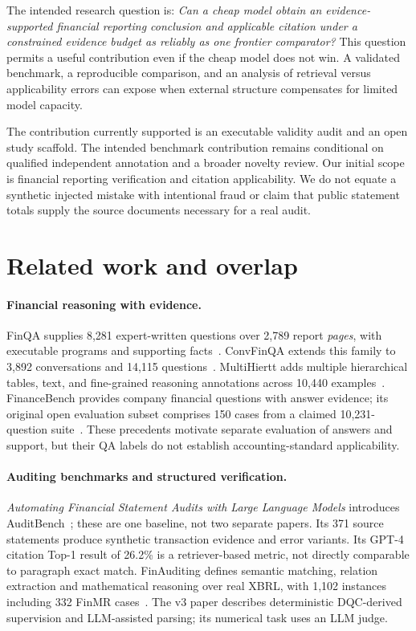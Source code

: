 \documentclass[11pt]{article}
\begin{document}
The intended research question is: \emph{Can a cheap model obtain an evidence-supported financial reporting conclusion and applicable citation under a constrained evidence budget as reliably as one frontier comparator?} This question permits a useful contribution even if the cheap model does not win. A validated benchmark, a reproducible comparison, and an analysis of retrieval versus applicability errors can expose when external structure compensates for limited model capacity.

The contribution currently supported is an executable validity audit and an open study scaffold. The intended benchmark contribution remains conditional on qualified independent annotation and a broader novelty review. Our initial scope is financial reporting verification and citation applicability. We do not equate a synthetic injected mistake with intentional fraud or claim that public statement totals supply the source documents necessary for a real audit.

\section{Related work and overlap}
\paragraph{Financial reasoning with evidence.}
FinQA supplies 8,281 expert-written questions over 2,789 report \emph{pages}, with executable programs and supporting facts~\cite{finqa}. ConvFinQA extends this family to 3,892 conversations and 14,115 questions~\cite{convfinqa}. MultiHiertt adds multiple hierarchical tables, text, and fine-grained reasoning annotations across 10,440 examples~\cite{multihiertt}. FinanceBench provides company financial questions with answer evidence; its original open evaluation subset comprises 150 cases from a claimed 10,231-question suite~\cite{financebench}. These precedents motivate separate evaluation of answers and support, but their QA labels do not establish accounting-standard applicability.

\paragraph{Auditing benchmarks and structured verification.}
\emph{Automating Financial Statement Audits with Large Language Models} introduces AuditBench~\cite{auditbench}; these are one baseline, not two separate papers. Its 371 source statements produce synthetic transaction evidence and error variants. Its GPT-4 citation Top-1 result of 26.2\% is a retriever-based metric, not directly comparable to paragraph exact match. FinAuditing defines semantic matching, relation extraction and mathematical reasoning over real XBRL, with 1,102 instances including 332 FinMR cases~\cite{finauditing}. The v3 paper describes deterministic DQC-derived supervision and LLM-assisted parsing; its numerical task uses an LLM judge.
\end{document}
